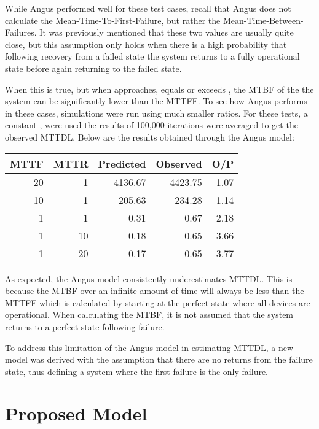 \documentclass[XXX,endnotes]{usetex-v1}
\begin{document}
While Angus performed well for these test cases, recall that Angus does not calculate the Mean-Time-To-First-Failure, but rather the Mean-Time-Between-Failures.  It was previously mentioned that these two values are usually quite close, but this assumption only holds when there is a high probability that following recovery from a failed state the system returns to a fully operational state before again returning to the failed state.

When  this is true, but when  approaches, equals or exceeds , the MTBF of the the system can be significantly lower than the MTTFF.  To see how Angus performs in these cases, simulations were run using much smaller  ratios.  For these tests, a constant ,  were used the results of 100,000 iterations were averaged to get the observed MTTDL.  Below are the results obtained through the Angus model:

\begin{center}
  \begin{tabular}{ | r | r | r | r | r | }
    \hline
      MTTF       & MTTR     & Predicted    & Observed  & O/P        \\ \hline
      20         & 1        & 4136.67      & 4423.75   & 1.07       \\ \hline
      10         & 1        & 205.63       & 234.28    & 1.14       \\ \hline
      1          & 1        & 0.31         & 0.67      & 2.18       \\ \hline
      1          & 10       & 0.18         & 0.65      & 3.66       \\ \hline
      1          & 20       & 0.17         & 0.65      & 3.77       \\ \hline
  \end{tabular}
\end{center}

As expected, the Angus model consistently underestimates MTTDL.  This is because the MTBF over an infinite amount of time will always be less than the MTTFF which is calculated by starting at the perfect state where all devices are operational.  When calculating the MTBF, it is not assumed that the system returns to a perfect state following failure.

To address this limitation of the Angus model in estimating MTTDL, a new model was derived with the assumption that there are no returns from the failure state, thus defining a system where the first failure is the only failure.

\section{Proposed Model}
\end{document}
